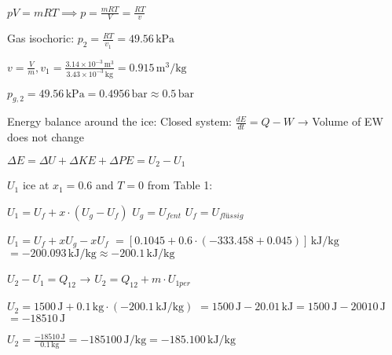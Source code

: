\( pV = mRT \implies p = \frac{mRT}{V} = \frac{RT}{v} \)  

Gas isochoric:  
\( p_2 = \frac{RT}{v_1} = 49.56 \, \text{kPa} \)  

\( v = \frac{V}{m}, v_1 = \frac{3.14 \times 10^{-3} \, \text{m}^3}{3.43 \times 10^{-3} \, \text{kg}} = 0.915 \, \text{m}^3/\text{kg} \)

\( p_{g,2} = 49.56 \, \text{kPa} = 0.4956 \, \text{bar} \approx 0.5 \, \text{bar} \)  

Energy balance around the ice:  
Closed system:  
\( \frac{dE}{dt} = Q - W \) → Volume of EW does not change  

\( \Delta E = \Delta U + \Delta KE + \Delta PE = U_2 - U_1 \)  

\( U_1 \) ice at \( x_1 = 0.6 \) and \( T = 0 \) from Table 1:  

\( U_1 = U_f + x \cdot (U_g - U_f) \)  
\( U_g = U_{fent} \)  
\( U_f = U_{flüssig} \)  

\( U_1 = U_f + xU_g - xU_f \)  
\( = [0.1045 + 0.6 \cdot (-333.458 + 0.045)] \, \text{kJ/kg} \)  
\( = -200.093 \, \text{kJ/kg} \approx -200.1 \, \text{kJ/kg} \)  

\( U_2 - U_1 = Q_{12} \) → \( U_2 = Q_{12} + m \cdot U_{1per} \)  

\( U_2 = 1500 \, \text{J} + 0.1 \, \text{kg} \cdot (-200.1 \, \text{kJ/kg}) \)  
\( = 1500 \, \text{J} - 20.01 \, \text{kJ} = 1500 \, \text{J} - 20010 \, \text{J} \)  
\( = -18510 \, \text{J} \)  

\( U_2 = \frac{-18510 \, \text{J}}{0.1 \, \text{kg}} = -185100 \, \text{J/kg} = -185.100 \, \text{kJ/kg} \)